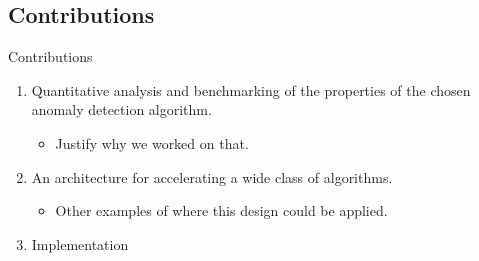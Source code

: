 \subsection{Contributions}
\begin{frame}[label=contributions]{Contributions}
    \begin{enumerate}
        \item Quantitative analysis and benchmarking of the properties of the
            chosen anomaly detection algorithm.
        \begin{itemize}
            \item Justify why we worked on that.
        \end{itemize}
        \item An architecture for accelerating a wide class of algorithms.
        \begin{itemize}
            \item Other examples of where this design could be applied.
        \end{itemize}
        \item Implementation
    \end{enumerate}
\end{frame}
